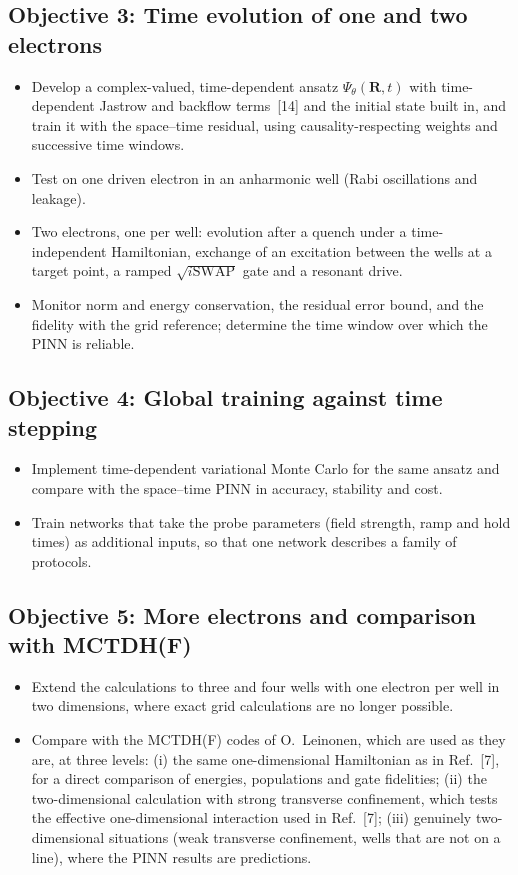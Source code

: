 \documentclass[12pt,a4paper]{article}
\begin{document}
\subsection*{Objective 3: Time evolution of one and two electrons}
\begin{itemize}
  \item Develop a complex-valued, time-dependent ansatz
  $\Psi_\theta(\boldsymbol R,t)$ with time-dependent Jastrow and
  backflow terms~[14] and the initial state built in, and train it
  with the space--time residual, using causality-respecting weights
  and successive time windows.
  \item Test on one driven electron in an anharmonic well (Rabi
  oscillations and leakage).
  \item Two electrons, one per well: evolution after a quench under a
  time-independent Hamiltonian, exchange of an excitation between the
  wells at a target point, a ramped $\sqrt{i\mathrm{SWAP}}$ gate and
  a resonant drive.
  \item Monitor norm and energy conservation, the residual error
  bound, and the fidelity with the grid reference; determine the
  time window over which the PINN is reliable.
\end{itemize}

\subsection*{Objective 4: Global training against time stepping}
\begin{itemize}
  \item Implement time-dependent variational Monte Carlo for the same
  ansatz and compare with the space--time PINN in accuracy, stability
  and cost.
  \item Train networks that take the probe parameters (field
  strength, ramp and hold times) as additional inputs, so that one
  network describes a family of protocols.
\end{itemize}

\subsection*{Objective 5: More electrons and comparison with MCTDH(F)}
\begin{itemize}
  \item Extend the calculations to three and four wells with one
  electron per well in two dimensions, where exact grid calculations
  are no longer possible.
  \item Compare with the MCTDH(F) codes of O.~Leinonen, which are used
  as they are, at three levels: (i) the same one-dimensional
  Hamiltonian as in Ref.~[7], for a direct comparison of energies,
  populations and gate fidelities; (ii) the two-dimensional
  calculation with strong transverse confinement, which tests the
  effective one-dimensional interaction used in Ref.~[7]; (iii)
  genuinely two-dimensional situations (weak transverse confinement,
  wells that are not on a line), where the PINN results are
  predictions.
\end{itemize}
\end{document}
